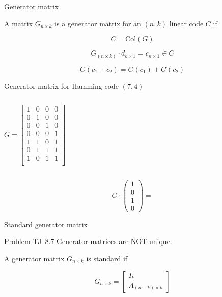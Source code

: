 \begin{frame}{Generator matrix}
  \begin{definition}
	A matrix $G_{n \times k}$ is a generator matrix for an $(n,k)$ linear code $C$ if 
	
	\[
	  C = \text{Col}(G)
	\]
  \end{definition}

  \[
	G_{(n \times k)} \cdot d_{k \times 1} = c_{n \times 1} \in C
  \]

  \[
	G(c_1 + c_2) = G(c_1) + G(c_2)
  \]
\end{frame}
\begin{frame}{Generator matrix for Hamming code $(7,4)$}
  \begin{columns}
	  \[
		G = \begin{bmatrix}
		  1 & 0 & 0 & 0 \\
		  0 & 1 & 0 & 0 \\
		  0 & 0 & 1 & 0 \\
		  0 & 0 & 0 & 1 \\
		  1 & 1 & 0 & 1 \\
		  0 & 1 & 1 & 1 \\
		  1 & 0 & 1 & 1 \\
		\end{bmatrix}
	  \]

  \end{columns}

  \[
	G \cdot \begin{pmatrix}
	  1 \\ 0 \\ 1 \\ 0
	\end{pmatrix}
	= 
  \]
\end{frame}
\begin{frame}{Standard generator matrix}
  \begin{exampleblock}{Problem TJ--8.7}
	Generator matrices are NOT unique.
  \end{exampleblock}

  \begin{definition}
	A generator matrix $G_{n \times k}$ is standard if

	\[
	  G_{n \times k} = \begin{bmatrix}
		I_k \\ A_{(n-k) \times k}
	  \end{bmatrix}
	\]
  \end{definition}
\end{frame}
